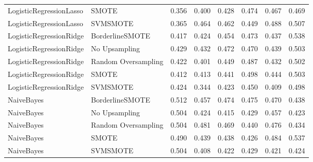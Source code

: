\begin{tabular}{llllllll}
     LogisticRegressionLasso &               SMOTE & 0.356 &                     0.400 &                 0.428 &                  0.474 &                                   0.467 &     0.469 \\
     LogisticRegressionLasso &            SVMSMOTE & 0.365 &                     0.464 &                 0.462 &                  0.449 &                                   0.488 &     0.507 \\
     LogisticRegressionRidge &     BorderlineSMOTE & 0.417 &                     0.424 &                 0.454 &                  0.473 &                                   0.437 &     0.538 \\
     LogisticRegressionRidge &       No Upsampling & 0.429 &                     0.432 &                 0.472 &                  0.470 &                                   0.439 &     0.503 \\
     LogisticRegressionRidge & Random Oversampling & 0.422 &                     0.401 &                 0.449 &                  0.487 &                                   0.432 &     0.502 \\
     LogisticRegressionRidge &               SMOTE & 0.412 &                     0.413 &                 0.441 &                  0.498 &                                   0.444 &     0.503 \\
     LogisticRegressionRidge &            SVMSMOTE & 0.424 &                     0.344 &                 0.423 &                  0.450 &                                   0.409 &     0.498 \\
                  NaiveBayes &     BorderlineSMOTE & 0.512 &                     0.457 &                 0.474 &                  0.475 &                                   0.470 &     0.438 \\
                  NaiveBayes &       No Upsampling & 0.504 &                     0.424 &                 0.415 &                  0.429 &                                   0.457 &     0.423 \\
                  NaiveBayes & Random Oversampling & 0.504 &                     0.481 &                 0.469 &                  0.440 &                                   0.476 &     0.434 \\
                  NaiveBayes &               SMOTE & 0.490 &                     0.439 &                 0.438 &                  0.426 &                                   0.484 &     0.537 \\
                  NaiveBayes &            SVMSMOTE & 0.504 &                     0.408 &                 0.422 &                  0.429 &                                   0.421 &     0.424 \\

\end{tabular}
